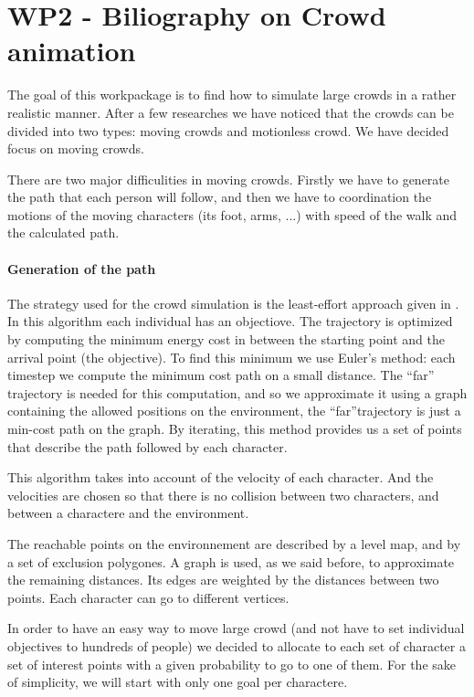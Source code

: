 \section{WP2 - Biliography on Crowd animation}

The goal of this workpackage is to find how to simulate large crowds in a rather realistic manner. After a few researches we have noticed that the crowds can be divided into two types: moving crowds and motionless crowd. We have decided focus on moving crowds. 

There are two major difficulities in moving crowds. Firstly we have to generate the path that each person will follow, and then we have to coordination the motions of the moving characters (its foot, arms, ...) with speed of the walk and the calculated path.

\paragraph{Generation of the path}

The strategy used for the crowd simulation is the least-effort approach given in \cite{PLE}.\\
In this algorithm each individual has an objectiove. The trajectory is optimized by computing the minimum energy cost in between the starting point and the arrival point (the objective). To find this minimum we use Euler's method: each timestep we compute the minimum cost path on a small distance. The ``far'' trajectory is needed for this computation, and so we approximate it using a graph containing the allowed positions on the environment, the ``far''trajectory is just a min-cost path on the graph. By iterating, this method provides us a set of points that describe the path followed by each character.

This algorithm takes into account of the velocity of each character. And the velocities are chosen so that there is no collision between two characters, and between a charactere and the environment.

The reachable points on the environnement are described by a level map, and by a set of exclusion polygones. A graph is used, as we said before, to approximate the remaining distances. Its edges are weighted by the distances between two points. Each character can go to different vertices.

In order to have an easy way to move large crowd (and not have to set individual objectives to hundreds of people) we decided to allocate to each set of character a set of interest points with a given probability to go to one of them. For the sake of simplicity, we will start with only one goal per charactere.

